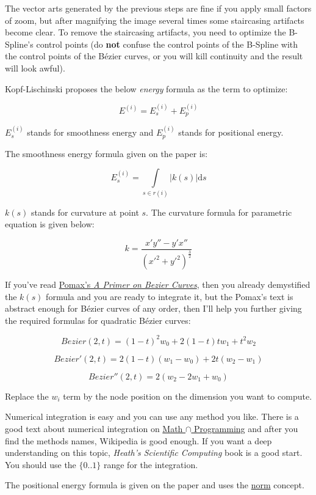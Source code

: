 The vector arts generated by the previous steps are fine if you apply small
factors of zoom, but after magnifying the image several times some staircasing
artifacts become clear. To remove the staircasing artifacts, you need to
optimize the B-Spline's control points (do \textbf{not} confuse the control
points of the B-Spline with the control points of the Bézier curves, or you will
kill continuity and the result will look awful).

Kopf-Lischinski proposes the below \emph{energy} formula as the term to
optimize:

$$E^{(i)} = E^{(i)}_s + E^{(i)}_p$$

$E^{(i)}_s$ stands for smoothness energy and $E^{(i)}_p$ stands for positional
energy.

The smoothness energy formula given on the paper is:

$$E^{(i)}_s = \int\limits_{s \in r(i)} |k(s)| \mathrm{d}s$$

$k(s)$ stands for curvature at point $s$. The curvature formula for parametric
equation is given below:

$$k = \frac{x'y'' - y'x''}{(x'^2+y'^2)^{\frac{3}{2}}}$$

If you've read \href{http://pomax.github.io/bezierinfo/}{Pomax's \emph{A Primer
on Bezier Curves}}, then you already demystified the $k(s)$ formula and you are
ready to integrate it, but the Pomax's text is abstract enough for Bézier curves
of any order, then I'll help you further giving the required formulas for
quadratic Bézier curves:

$$Bezier(2, t) = (1-t)^2 w_0 + 2 (1-t) t w_1 + t^2 w_2$$

$$Bezier'(2, t) = 2 (1-t) (w_1-w_0) + 2 t (w_2-w_1)$$

$$Bezier''(2, t) = 2 (w_2 - 2 w_1 + w_0)$$

Replace the $w_i$ term by the node position on the dimension you want to
compute.

Numerical integration is easy and you can use any method you like. There is a
good text about numerical integration on
\href{http://jeremykun.com/2012/01/08/numerical-integration/}{Math $\cap$
Programming} and after you find the methods names, Wikipedia is good enough. If
you want a deep understanding on this topic, \emph{Heath's Scientific Computing}
book is a good start. You should use the $\{0..1\}$ range for the integration.

The positional energy formula is given on the paper and uses the
\href{http://en.wikipedia.org/wiki/Norm_(mathematics)}{norm} concept.
